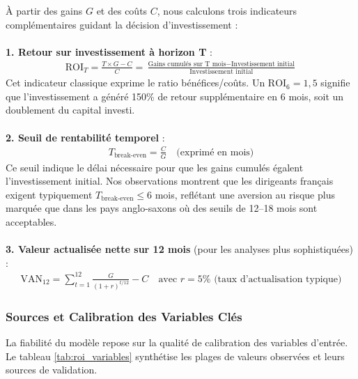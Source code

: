 À partir des gains $G$ et des coûts $C$, nous calculons trois indicateurs complémentaires guidant la décision d'investissement :
\\\\
\textbf{1. Retour sur investissement à horizon T} :
\begin{align}
\text{ROI}_T = \frac{T \times G - C}{C} = \frac{\text{Gains cumulés sur T mois} - \text{Investissement initial}}{\text{Investissement initial}}
\end{align}
\medskip
Cet indicateur classique exprime le ratio bénéfices/coûts. Un $\text{ROI}_6 = 1{,}5$ signifie que l'investissement a généré 150\% de retour supplémentaire en 6 mois, soit un doublement du capital investi.
\\\\
\textbf{2. Seuil de rentabilité temporel} :
\begin{align}
T_{\text{break-even}} = \frac{C}{G} \quad \text{(exprimé en mois)}
\end{align}
\medskip
Ce seuil indique le délai nécessaire pour que les gains cumulés égalent l'investissement initial. Nos observations montrent que les dirigeants français exigent typiquement $T_{\text{break-even}} \leq 6$ mois, reflétant une aversion au risque plus marquée que dans les pays anglo-saxons où des seuils de 12--18 mois sont acceptables.
\\\\
\textbf{3. Valeur actualisée nette sur 12 mois} (pour les analyses plus sophistiquées) :
\begin{align}
\text{VAN}_{12} = \sum_{t=1}^{12} \frac{G}{(1+r)^{t/12}} - C \quad \text{avec } r = 5\% \text{ (taux d'actualisation typique)}
\end{align}

\subsubsection{Sources et Calibration des Variables Clés}

La fiabilité du modèle repose sur la qualité de calibration des variables d'entrée. Le tableau \ref{tab:roi_variables} synthétise les plages de valeurs observées et leurs sources de validation.

